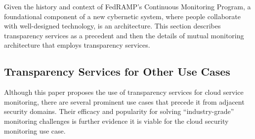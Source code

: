 \documentclass{jdf}
\begin{document}
Given the history and context of FedRAMP's Continuous Monitoring Program, a foundational component of a new cybernetic system, where people collaborate with well-designed technology, is an architecture. This section describes transparency services as a precedent and then the details of mutual monitoring architecture that employs transparency services.

\subsection{Transparency Services for Other Use Cases} \label{use_cases}

Although this paper proposes the use of transparency services for cloud service monitoring, there are several prominent use cases that precede it from adjacent security domains. Their efficacy and popularity for solving ``industry-grade'' monitoring challenges is further evidence it is viable for the cloud security monitoring use case.
\end{document}
